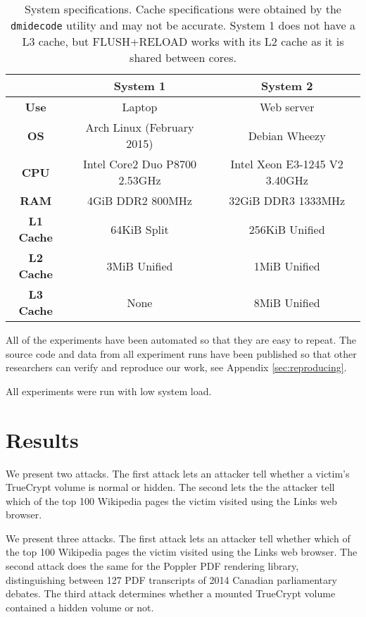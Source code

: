 \documentclass[letterpaper,twocolumn,10pt]{article}
\begin{document}
\begin{table*}
    \centering
\begin{tabular}{|c|c|c|}
    \hline
    & \textbf{System 1} & \textbf{System 2} \\
    \hline
    \textbf{Use} & Laptop & Web server \\
    \hline
    \textbf{OS} & Arch Linux (February 2015) & Debian Wheezy \\
    \hline
    \textbf{CPU} & Intel Core2 Duo P8700 2.53GHz & Intel Xeon E3-1245 V2 3.40GHz  \\
    \hline
    \textbf{RAM} & 4GiB DDR2 800MHz & 32GiB DDR3 1333MHz \\
    \hline
    \textbf{L1 Cache} & 64KiB Split & 256KiB Unified \\
    \hline
    \textbf{L2 Cache} & 3MiB Unified & 1MiB Unified \\
    \hline
    \textbf{L3 Cache} & None & 8MiB Unified \\
    \hline
\end{tabular}
\caption{System specifications. Cache specifications were obtained by the
\texttt{dmidecode} utility and may not be accurate. System 1 does not have a L3
cache, but FLUSH+RELOAD works with its L2 cache as it is shared between cores.}
\label{table:specs}
\end{table*}

All of the experiments have been automated so that they are easy to repeat. The
source code and data from all experiment runs have been published so that other
researchers can verify and reproduce our work, see Appendix
\ref{sec:reproducing}.

All experiments were run with low system load.

\section{Results}
\label{sec:results}

We present two attacks. The first attack lets an attacker tell whether
a victim's TrueCrypt volume is normal or hidden. The second lets the the
attacker tell which of the top 100 Wikipedia pages the victim visited using the
Links web browser.

We present three attacks. The first attack lets an attacker tell whether which
of the top 100 Wikipedia pages the victim visited using the Links web browser.
The second attack does the same for the Poppler PDF rendering library,
distinguishing between 127 PDF transcripts of 2014 Canadian parliamentary
debates. The third attack determines whether a mounted TrueCrypt volume
contained a hidden volume or not.
\end{document}

